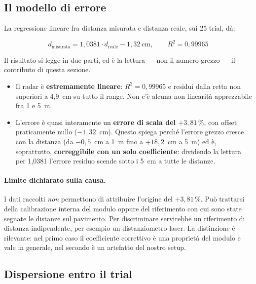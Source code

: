 \subsection{Il modello di errore}

La regressione lineare fra distanza misurata e distanza reale, sui 25 trial, dà:

\begin{equation}
d_{\text{misurata}} = 1{,}0381 \cdot d_{\text{reale}} - 1{,}32~\text{cm},
\qquad R^2 = 0{,}99965
\label{eq:regressione}
\end{equation}

Il risultato si legge in due parti, ed è la lettura --- non il numero grezzo --- il
contributo di questa sezione.

\begin{itemize}[leftmargin=1.4em,itemsep=3pt]
  \item Il radar è \textbf{estremamente lineare}: $R^2 = 0{,}99965$ e residui dalla
        retta non superiori a 4,9~cm su tutto il range. Non c'è alcuna non linearità
        apprezzabile fra 1 e 5~m.
  \item L'errore è quasi interamente un \textbf{errore di scala del $+3{,}81\,\%$},
        con offset praticamente nullo ($-1{,}32$~cm). Questo spiega perché l'errore
        grezzo cresce con la distanza (da $-0{,}5$~cm a 1~m fino a $+18{,}2$~cm a
        5~m) ed è, soprattutto, \textbf{correggibile con un solo coefficiente}:
        dividendo la lettura per 1,0381 l'errore residuo scende sotto i 5~cm a tutte
        le distanze.
\end{itemize}

\paragraph{Limite dichiarato sulla causa.} I dati raccolti \emph{non} permettono di
attribuire l'origine del $+3{,}81\,\%$. Può trattarsi della calibrazione interna del
modulo oppure del riferimento con cui sono state segnate le distanze sul pavimento.
Per discriminare servirebbe un riferimento di distanza indipendente, per esempio un
distanziometro laser. La distinzione è rilevante: nel primo caso il coefficiente
correttivo è una proprietà del modulo e vale in generale, nel secondo è un artefatto
del nostro setup.

\subsection{Dispersione entro il trial}

